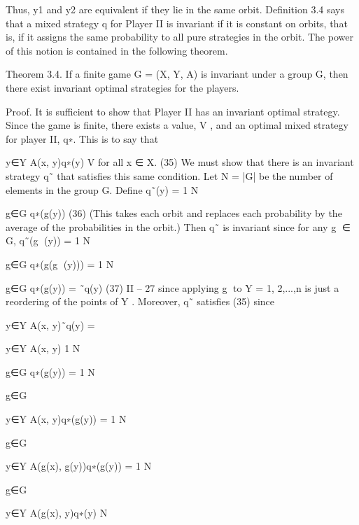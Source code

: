 Thus, y1 and y2 are equivalent if they lie in the same orbit. Definition 3.4 says that a mixed
strategy q for Player II is invariant if it is constant on orbits, that is, if it assigns the same
probability to all pure strategies in the orbit. The power of this notion is contained in the
following theorem.
\begin{framed}
Theorem 3.4. If a finite game G = (X, Y, A) is invariant under a group G, then there
exist invariant optimal strategies for the players.
\end{framed}
Proof. It is sufficient to show that Player II has an invariant optimal strategy. Since the
game is finite, there exists a value, V , and an optimal mixed strategy for player II, q∗.
This is to say that


y∈Y
A(x, y)q∗(y) \leq V for all x ∈ X. (35)
We must show that there is an invariant strategy q˜ that satisfies this same condition. Let
N = |G| be the number of elements in the group G. Define
q˜(y) = 1
N


g∈G
q∗(g(y)) (36)
(This takes each orbit and replaces each probability by the average of the probabilities in
the orbit.) Then q˜ is invariant since for any g ∈ G,
q˜(g
(y)) = 1
N


g∈G
q∗(g(g
(y)))
= 1
N


g∈G
q∗(g(y)) = ˜q(y)
(37)
II – 27
since applying g to Y = {1, 2,...,n} is just a reordering of the points of Y . Moreover, q˜
satisfies (35) since


y∈Y
A(x, y)˜q(y) = 

y∈Y
A(x, y) 1
N


g∈G
q∗(g(y))
= 1
N


g∈G


y∈Y
A(x, y)q∗(g(y))
= 1
N


g∈G


y∈Y
A(g(x), g(y))q∗(g(y))
= 1
N


g∈G


y∈Y
A(g(x), y)q∗(y)
N


